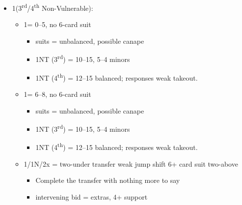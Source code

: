 \documentclass[a4paper,14pt]{extarticle}
\begin{document}
\begin{itemize}
\label{note:14}
\item 1\clubs (3\textsuperscript{rd}/4\textsuperscript{th} Non-Vulnerable):
	\begin{itemize}
   \item 1\diamonds = 0--5, no 6-card suit
		\begin{itemize}
      \item suits = unbalanced, possible canape
      \item 1NT (3\textsuperscript{rd}) = 10--15, 5--4 minors
      \item 1NT (4\textsuperscript{th}) = 12--15 balanced; responses weak takeout.
		\end{itemize}
   \item 1\hearts = 6--8, no 6-card suit
		\begin{itemize}
      \item suits = unbalanced, possible canape
      \item 1NT (3\textsuperscript{rd}) = 10--15, 5--4 minors
      \item 1NT (4\textsuperscript{th}) = 12--15 balanced; responses weak takeout.
		\end{itemize}
   \item 1\spades/1N/2x = two-under transfer weak jump shift 6+ card suit two-above
		\begin{itemize}
		\item Complete the transfer with nothing more to say
		\item intervening bid = extras, 4+ support
		\end{itemize}
	\end{itemize}

\newpage


\end{itemize}
\end{document}

